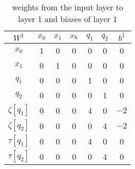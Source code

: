 \begin{table}[p]
	\centering
	\begin{tabular}{|c| c c c c c |c|}
		\hline 
		$W^1$ & $x_0$ & $x_1$ & $x_{\mathrm{h}}$ & $q_1$ & $q_2$ & $b^1$ \\
		\hline
		$x_0$ & 1 & 0 & 0 & 0 & 0 & 0 \\
		$x_1$ & 0 & 1 & 0 & 0 & 0 & 0 \\
		$q_1$ & 0 & 0 & 0 & 1 & 0 & 0 \\
		$q_2$ & 0 & 0 & 0 & 0 & 1 & 0 \\
		$\zeta[q_1]$ & 0 & 0 & 0 & 4 & 0 & $-2$ \\
		$\zeta[q_2]$ & 0 & 0 & 0 & 0 & 4 & $-2$ \\
		$\tau[q_1]$ & 0 & 0 & 0 & 4 & 0 & 0 \\
		$\tau[q_2]$ & 0 & 0 & 0 & 0 & 4 & 0 \\
		\hline
	\end{tabular}
	\caption{weights from the input layer to layer 1 and biases of layer 1}
	\label{tab:W1b1ex}
\end{table}